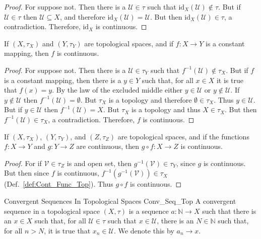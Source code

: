     \begin{proof}
        For suppose not. Then there is a $\mathcal{U}\in\tau$ such that
        $\textrm{id}_{X}(\mathcal{U})\notin\tau$. But if $\mathcal{U}\in\tau$
        then $\mathcal{U}\subseteq{X}$, and therefore
        $\textrm{id}_{X}(\mathcal{U})=\mathcal{U}$. But then
        $\textrm{id}_{X}(\mathcal{U})\in\tau$, a contradiction. Therefore,
        $\textrm{id}_{X}$ is continuous.
    \end{proof}
    \begin{theorem}
        If $(X,\tau_{X})$ and $(Y,\tau_{Y})$ are topological spaces, and if
        $f:X\rightarrow{Y}$ is a constant mapping, then $f$ is continuous.
    \end{theorem}
    \begin{proof}
        For suppose not. Then there is a $\mathcal{U}\in\tau_{Y}$ such that
        $f^{\minus{1}}(\mathcal{U})\notin\tau_{X}$. But if $f$ is a constant
        mapping, then there is a $y\in{Y}$ such that, for all $x\in{X}$ it is
        true that $f(x)=y$. By the law of the excluded middle either
        $y\in\mathcal{U}$ or $y\notin\mathcal{U}$. If $y\notin\mathcal{U}$ then
        $f^{\minus{1}}(\mathcal{U})=\emptyset$. But $\tau_{X}$ is a topology and
        therefore $\emptyset\in\tau_{X}$. Thus $y\in\mathcal{U}$. But if
        $y\in\mathcal{U}$ then $f^{\minus{1}}(\mathcal{U})=X$. But $\tau_{X}$ is
        a topology and thus $X\in\tau_{X}$. But then
        $f^{\minus{1}}(\mathcal{U})\in\tau_{X}$, a contradiction. Therefore,
        $f$ is continuous.
    \end{proof}
    \begin{theorem}
        If $(X,\tau_{X})$, $(Y,\tau_{Y})$, and $(Z,\tau_{Z})$ are topological
        spaces, and if the functions $f:X\rightarrow{Y}$ and $g:Y\rightarrow{Z}$
        are continuous, then $g\circ{f}:X\rightarrow{Z}$ is continuous.
    \end{theorem}
    \begin{proof}
        For if $\mathcal{V}\in\tau_{Z}$ is and open set, then
        $g^{\minus{1}}(\mathcal{V})\in\tau_{Y}$, since $g$ is continuous. But
        then since $f$ is continuous,
        $f^{\minus{1}}(g^{\minus{1}}(\mathcal{V}))\in\tau_{X}$
        (Def.~\ref{def:Cont_Func_Top}). Thus $g\circ{f}$ is continuous.
    \end{proof}
    \begin{ldefinition}{Convergent Sequences In Topological Spaces}
                       {Conv_Seq_Top}
        A convergent sequence in a topological space $(X,\tau)$ is a sequence
        $a:\mathbb{N}\rightarrow{X}$ such that there is an $x\in{X}$ such that,
        for all $\mathcal{U}\in\tau$ such that $x\in\mathcal{U}$, there is an
        $N\in\mathbb{N}$ such that, for all $n>N$, it is true that
        $x_{n}\in\mathcal{U}$. We denote this by $a_{n}\rightarrow{x}$.
    \end{ldefinition}

